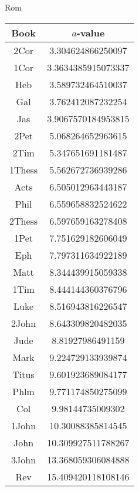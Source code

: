 \documentclass[12pt,letterpaper]{article}
\begin{document}
Rom
\begin{longtable}{|c|c|}
\hline
 Book & $a$-value \\ \hline
2Cor & 3.304624866250097 \\ \hline
 1Cor & 3.3634385915073337 \\ \hline
 Heb & 3.589732464510037 \\ \hline
 Gal & 3.762412087232254 \\ \hline
 Jas & 3.9067570184953815 \\ \hline
 2Pet & 5.068264652963615 \\ \hline
 2Tim & 5.347651691181487 \\ \hline
 1Thess & 5.562672736939286 \\ \hline
 Acts & 6.505012963443187 \\ \hline
 Phil & 6.559658832524622 \\ \hline
 2Thess & 6.597659163278408 \\ \hline
 1Pet & 7.751629182606049 \\ \hline
 Eph & 7.797311634922189 \\ \hline
 Matt & 8.344439915059338 \\ \hline
 1Tim & 8.444144360376796 \\ \hline
 Luke & 8.516943816226547 \\ \hline
 2John & 8.643309820482035 \\ \hline
 Jude & 8.81927986491159 \\ \hline
 Mark & 9.224729133939874 \\ \hline
 Titus & 9.601923689084177 \\ \hline
 Phlm & 9.771174850275099 \\ \hline
 Col & 9.98144735009302 \\ \hline
 1John & 10.30088385814545 \\ \hline
 John & 10.309927511788267 \\ \hline
 3John & 13.368059306084888 \\ \hline
 Rev & 15.409420118108146 \\ \hline 
\end{longtable}
\end{document}
